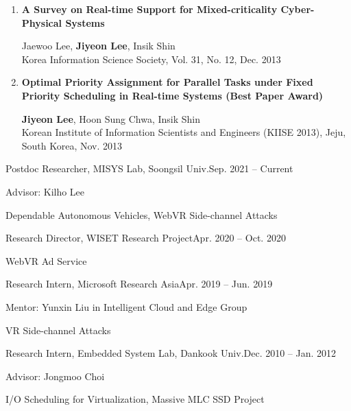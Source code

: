 \documentclass[11pt,letterpaper]{article}
\begin{document}
\begin{enumerate}
	\item \textbf{A Survey on Real-time Support for Mixed-criticality Cyber-Physical Systems} \\
	\begin{small}
		Jaewoo Lee, \textbf{Jiyeon Lee}, Insik Shin\\ 
		Korea Information Science Society, Vol. 31, No. 12, Dec. 2013
	\end{small}
	
	\item \textbf{Optimal Priority Assignment for Parallel Tasks under Fixed Priority Scheduling in Real-time Systems (Best Paper Award)} \\
	\begin{small}
		\textbf{Jiyeon Lee}, Hoon Sung Chwa, Insik Shin\\ 
		Korean Institute of Information Scientists and Engineers (KIISE 2013), Jeju, South Korea, Nov. 2013
	\end{small}
\end{enumerate}

%
%

\begin{envtime}{Postdoc Researcher, MISYS Lab, Soongsil Univ.}{Sep. 2021 -- Current}
	\item Advisor: Kilho Lee
	\item Dependable Autonomous Vehicles, WebVR Side-channel Attacks
\end{envtime}
\begin{envtime}{Research Director, WISET Research Project}{Apr. 2020 -- Oct. 2020}
	\item WebVR Ad Service
\end{envtime}
\begin{envtime}[China]{Research Intern, Microsoft Research Asia}{Apr. 2019 -- Jun. 2019}
	\item Mentor:  Yunxin Liu in Intelligent Cloud and Edge Group
	\item VR Side-channel Attacks
\end{envtime}
\begin{envtime}{Research Intern, Embedded System Lab, Dankook Univ.}{Dec. 2010 -- Jan. 2012}
	\item Advisor: Jongmoo Choi
	\item I/O Scheduling for Virtualization, Massive MLC SSD Project
\end{envtime}

\end{document}

